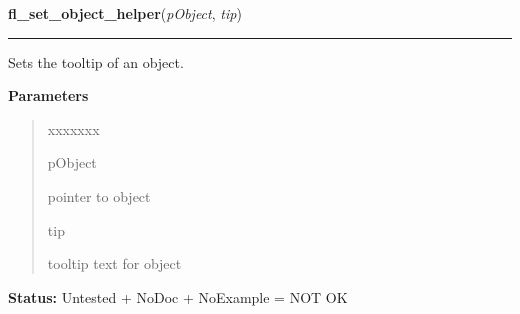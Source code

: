 \hspace{.8\funcindent}\begin{boxedminipage}{\funcwidth}

    \raggedright \textbf{fl\_set\_object\_helper}(\textit{pObject}, \textit{tip})

    \vspace{-1.5ex}

    \rule{\textwidth}{0.5\fboxrule}
\setlength{\parskip}{2ex}
    Sets the tooltip of an object.

\setlength{\parskip}{1ex}
      \textbf{Parameters}
      \vspace{-1ex}

      \begin{quote}
        \begin{Ventry}{xxxxxxx}

          \item[pObject]

          pointer to object

          \item[tip]

          tooltip text for object

        \end{Ventry}

      \end{quote}

\textbf{Status:} Untested + NoDoc + NoExample = NOT OK



    \end{boxedminipage}

    \label{xformslib:library:fl_set_object_position}

    \vspace{0.5ex}

